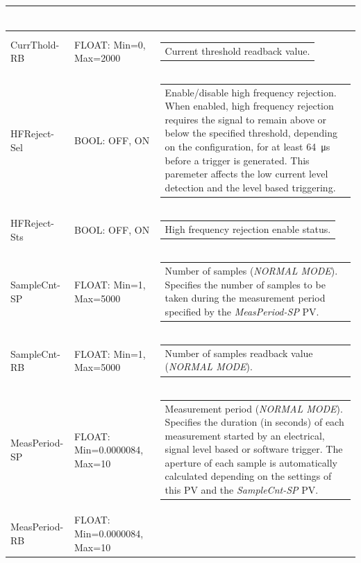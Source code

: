\documentclass[openany]{article}
\begin{document}
\begin{longtable}{| m{3.0cm} m{4.5cm} m{7.0cm} |}
\begin{tabular}{@{}m{6cm}@{}}
						\end{tabular} \\ \hline
		CurrThold-RB & FLOAT: Min=0, Max=2000 & \begin{tabular}{@{}m{6cm}@{}}
	    					Current threshold readback value.
						\end{tabular} \\ \hline
		HFReject-Sel & BOOL: OFF, ON & \begin{tabular}{@{}m{6cm}@{}}
	    					Enable/disable high frequency rejection. When enabled, high frequency rejection requires the signal to remain above or below the specified threshold, depending on the configuration, for at least \SI{64}{\micro\second} before a trigger is generated. This paremeter affects the low current level detection and the level based triggering.
						\end{tabular} \\ \hline
		HFReject-Sts & BOOL: OFF, ON & \begin{tabular}{@{}m{6cm}@{}}
	    					High frequency rejection enable status.
						\end{tabular} \\ \hline
		SampleCnt-SP & FLOAT: Min=1, Max=5000 & \begin{tabular}{@{}m{6cm}@{}}
	    					Number of samples (\emph{NORMAL MODE}). Specifies the number of samples to be taken during the measurement period specified by the \emph{MeasPeriod-SP} PV.
						\end{tabular} \\ \hline
		SampleCnt-RB & FLOAT: Min=1, Max=5000 & \begin{tabular}{@{}m{6cm}@{}}
	    					Number of samples readback value (\emph{NORMAL MODE}).
						\end{tabular} \\ \hline
		MeasPeriod-SP & FLOAT: Min=0.0000084, Max=10 & \begin{tabular}{@{}m{6cm}@{}}
	    					Measurement period (\emph{NORMAL MODE}). Specifies the duration (in seconds) of each measurement started by an electrical, signal level based or software trigger. The aperture of each sample is automatically calculated depending on the settings of this PV and the \emph{SampleCnt-SP} PV.
						\end{tabular} \\ \hline
		MeasPeriod-RB & FLOAT: Min=0.0000084, Max=10 & \begin{tabular}{@{}m{6cm}@{}}

\end{tabular}
\end{longtable}
\end{document}
